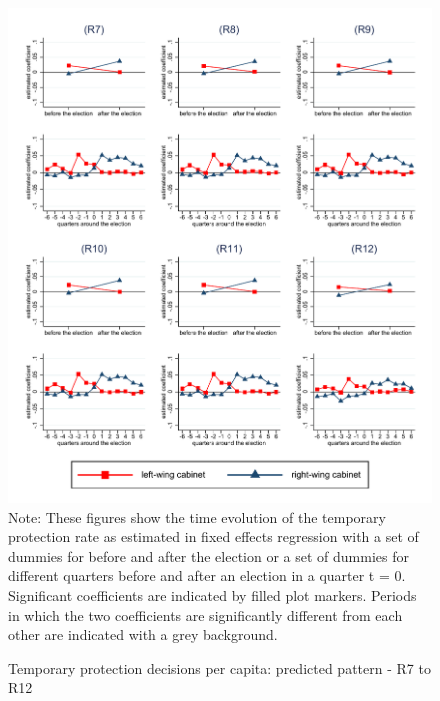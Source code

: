 \documentclass[11pt,a4paper]{scrartcl}
\begin{document}
\clearpage
\FloatBarrier



\clearpage
\FloatBarrier





\clearpage
\FloatBarrier


\clearpage
\FloatBarrier
\begin{figure}[!ht]
	\caption{Temporary protection decisions per capita: predicted pattern - R7 to R12}
	\includegraphics[width=1\textwidth]{../results/decisions/temporary_protection_rate_graphs_R7-R12.pdf}
	\scriptsize{Note: These figures show the time evolution of the temporary protection rate as estimated in fixed effects regression with a set of dummies for before and after the election or a set of dummies for different quarters before and after an election in a quarter t = 0. Significant coefficients are indicated by filled plot markers. Periods in which the two coefficients are significantly different from each other are indicated with a grey background.}
\end{figure}
\end{document}
